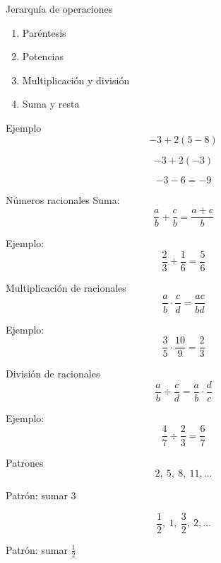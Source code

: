 \documentclass{beamer}
\begin{document}
	\begin{frame}{Jerarquía de operaciones}
		\begin{enumerate}
			\item Paréntesis
			\item Potencias
			\item Multiplicación y división
			\item Suma y resta
		\end{enumerate}
	\end{frame}
	
	\begin{frame}{Ejemplo}
		\[
		-3+2(5-8)
		\]
		
		\pause
		
		\[
		-3+2(-3)
		\]
		
		\pause
		
		\[
		-3-6=-9
		\]
	\end{frame}
	
	\begin{frame}{Números racionales}
		Suma:
		\[
		\frac{a}{b}+\frac{c}{b}=\frac{a+c}{b}
		\]
		
		\pause
		
		Ejemplo:
		\[
		\frac{2}{3}+\frac{1}{6}=\frac{5}{6}
		\]
	\end{frame}
	
	\begin{frame}{Multiplicación de racionales}
		\[
		\frac{a}{b}\cdot\frac{c}{d}=\frac{ac}{bd}
		\]
		
		Ejemplo:
		\[
		\frac{3}{5}\cdot\frac{10}{9}=\frac{2}{3}
		\]
	\end{frame}
	
	\begin{frame}{División de racionales}
		\[
		\frac{a}{b}\div\frac{c}{d}=\frac{a}{b}\cdot\frac{d}{c}
		\]
		
		Ejemplo:
		\[
		\frac{4}{7}\div\frac{2}{3}=\frac{6}{7}
		\]
	\end{frame}
	
	\begin{frame}{Patrones}
		\[
		2,\ 5,\ 8,\ 11,\dots
		\]
		
		Patrón: sumar 3
		
		\pause
		
		\[
		\frac12,\ 1,\ \frac32,\ 2,\dots
		\]
		
		Patrón: sumar \(\frac12\)
	\end{frame}
	
\end{document}
